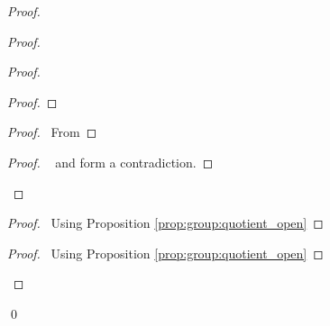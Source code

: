 \begin{proof}
\begin{proof}
\begin{proof}
\begin{proof}
      \end{proof}
      \begin{proof}
        \pf\ From 
      \end{proof}
      \qedstep
      \begin{proof}
        \pf\  and  form a contradiction.
      \end{proof}
    \end{proof}
    \begin{proof}
      \pf\ Using Proposition \ref{prop:group:quotient_open}
    \end{proof}
    \begin{proof}
      \pf\ Using Proposition \ref{prop:group:quotient_open}
    \end{proof}
  \end{proof}
  \qed
\end{proof}
